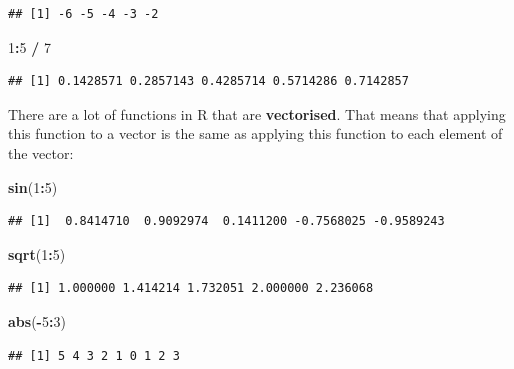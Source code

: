 \documentclass[
]{book}
\newenvironment{Shaded}{\begin{snugshade}}{\end{snugshade}}
\newcommand{\DecValTok}[1]{\textcolor[rgb]{0.00,0.00,0.81}{#1}}
\newcommand{\KeywordTok}[1]{\textcolor[rgb]{0.13,0.29,0.53}{\textbf{#1}}}
\newcommand{\NormalTok}[1]{#1}
\newcommand{\OperatorTok}[1]{\textcolor[rgb]{0.81,0.36,0.00}{\textbf{#1}}}
\newcommand{\StringTok}[1]{\textcolor[rgb]{0.31,0.60,0.02}{#1}}
\begin{document}
\begin{verbatim}
## [1] -6 -5 -4 -3 -2
\end{verbatim}

\begin{Shaded}
\begin{Highlighting}[]
\DecValTok{1}\OperatorTok{:}\DecValTok{5} \OperatorTok{/}\StringTok{ }\DecValTok{7}
\end{Highlighting}
\end{Shaded}

\begin{verbatim}
## [1] 0.1428571 0.2857143 0.4285714 0.5714286 0.7142857
\end{verbatim}

There are a lot of functions in R that are \textbf{vectorised}. That means that applying this function to a vector is the same as applying this function to each element of the vector:

\begin{Shaded}
\begin{Highlighting}[]
\KeywordTok{sin}\NormalTok{(}\DecValTok{1}\OperatorTok{:}\DecValTok{5}\NormalTok{)}
\end{Highlighting}
\end{Shaded}

\begin{verbatim}
## [1]  0.8414710  0.9092974  0.1411200 -0.7568025 -0.9589243
\end{verbatim}

\begin{Shaded}
\begin{Highlighting}[]
\KeywordTok{sqrt}\NormalTok{(}\DecValTok{1}\OperatorTok{:}\DecValTok{5}\NormalTok{)}
\end{Highlighting}
\end{Shaded}

\begin{verbatim}
## [1] 1.000000 1.414214 1.732051 2.000000 2.236068
\end{verbatim}

\begin{Shaded}
\begin{Highlighting}[]
\KeywordTok{abs}\NormalTok{(}\OperatorTok{-}\DecValTok{5}\OperatorTok{:}\DecValTok{3}\NormalTok{)}
\end{Highlighting}
\end{Shaded}

\begin{verbatim}
## [1] 5 4 3 2 1 0 1 2 3
\end{verbatim}
\end{document}
